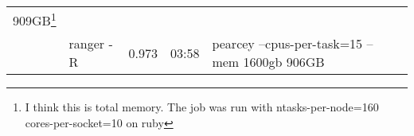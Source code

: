 \documentclass[11pt]{article}
\begin{document}
\begin{table}[!ht]
\begin{minipage}{\textwidth}
\begin{tabular}{|l|l|l|l|l|l|p{1cm}|}
                                                                                                                                           909GB\footnote{I
                                                                                                                                           think
                                                                                                                                           this
                                                                                                                                           is
                                                                                                                                           total
                                                                                                                                           memory. The
                                                                                                                                           job
                                                                                                                                           was
                                                                                                                                           run
                                                                                                                                           with
                                                                                                                                                   ntasks-per-node=160
                                                                                                                                           cores-per-socket=10
                                                                                                                                           on
                                                                                                                                           ruby
                                                                                                                                           }  \\
& ranger - R        &             0.973     &      03:58           &       pearcey --cpus-per-task=15 --mem 1600gb   906GB \\
\hline


\end{tabular}
\end{minipage}
\end{table}
\end{document}

